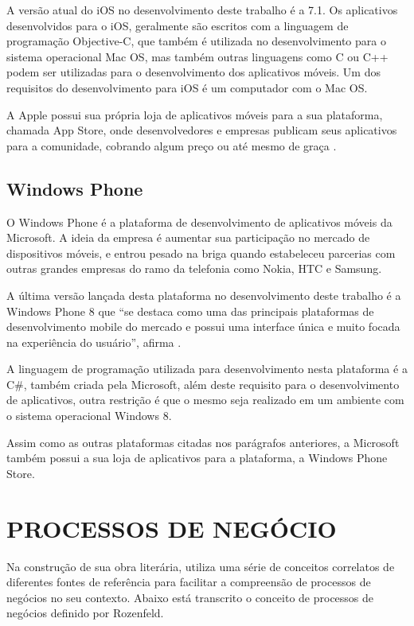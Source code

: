 \documentclass[
	12pt,				%
	openright,			%
	oneside,			%
	a4paper,			%
	chapter=TITLE,		%
	section=TITLE,		%
	english,			%
	french,				%
	spanish,			%
	brazil				%
	]{abntex2}
\begin{document}
A versão atual do iOS no desenvolvimento deste trabalho é a 7.1. Os aplicativos desenvolvidos para o iOS, geralmente são escritos com a linguagem de programação Objective-C, que também é utilizada no desenvolvimento para o sistema operacional Mac OS, mas também outras linguagens como C ou C++ podem ser utilizadas para o desenvolvimento dos aplicativos móveis. Um dos requisitos do desenvolvimento para iOS é um computador com o Mac OS. 

A Apple possui sua própria loja de aplicativos móveis para a sua plataforma, chamada App Store, onde desenvolvedores e empresas publicam seus aplicativos para a comunidade, cobrando algum preço ou até mesmo de graça \cite{pilonesIOS}.

\subsection{Windows Phone}
O Windows Phone é a plataforma de desenvolvimento de aplicativos móveis da Microsoft. A ideia da empresa é aumentar sua participação no mercado de dispositivos móveis, e entrou pesado na briga quando estabeleceu parcerias com outras grandes empresas do ramo da telefonia como Nokia, HTC e Samsung. 

A última versão lançada desta plataforma no desenvolvimento deste trabalho é a Windows Phone 8 que “se destaca como uma das principais plataformas de desenvolvimento mobile do mercado e possui uma interface única e muito focada na experiência do usuário”, afirma . 

A linguagem de programação utilizada para desenvolvimento nesta plataforma é a C\#, também criada pela Microsoft, além deste requisito para o desenvolvimento de aplicativos, outra restrição é que o mesmo seja realizado em um ambiente com o sistema operacional Windows 8. 

Assim como as outras plataformas citadas nos parágrafos anteriores, a Microsoft também possui a sua loja de aplicativos para a plataforma, a Windows Phone Store.

\section{PROCESSOS DE NEGÓCIO}
Na construção de sua obra literária,  utiliza uma série de conceitos correlatos de diferentes fontes de referência para facilitar a compreensão de processos de negócios no seu contexto. Abaixo está transcrito o conceito de processos de negócios definido por Rozenfeld.
\end{document}
